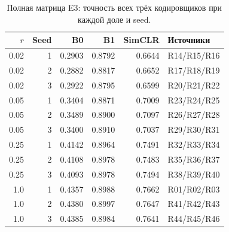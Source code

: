 \begin{table}[H]\centering\footnotesize
\setlength{\tabcolsep}{4pt}
\caption{Полная матрица E3: точность всех трёх кодировщиков при каждой доле и seed.}\label{tab:matrix}
\begin{tabular}{rrrrrl}
\toprule
$r$ & Seed & B0 & B1 & SimCLR & Источники \\
\midrule
0.02 & 1 & 0.2903 & 0.8792 & 0.6644 & R14/R15/R16 \\
0.02 & 2 & 0.2882 & 0.8817 & 0.6652 & R17/R18/R19 \\
0.02 & 3 & 0.2922 & 0.8795 & 0.6599 & R20/R21/R22 \\
0.05 & 1 & 0.3404 & 0.8871 & 0.7009 & R23/R24/R25 \\
0.05 & 2 & 0.3489 & 0.8900 & 0.7097 & R26/R27/R28 \\
0.05 & 3 & 0.3400 & 0.8910 & 0.7037 & R29/R30/R31 \\
0.25 & 1 & 0.4142 & 0.8964 & 0.7491 & R32/R33/R34 \\
0.25 & 2 & 0.4108 & 0.8978 & 0.7483 & R35/R36/R37 \\
0.25 & 3 & 0.4093 & 0.8978 & 0.7494 & R38/R39/R40 \\
1.0 & 1 & 0.4357 & 0.8988 & 0.7662 & R01/R02/R03 \\
1.0 & 2 & 0.4380 & 0.8997 & 0.7647 & R41/R42/R43 \\
1.0 & 3 & 0.4385 & 0.8984 & 0.7641 & R44/R45/R46 \\
\bottomrule
\end{tabular}
\end{table}
